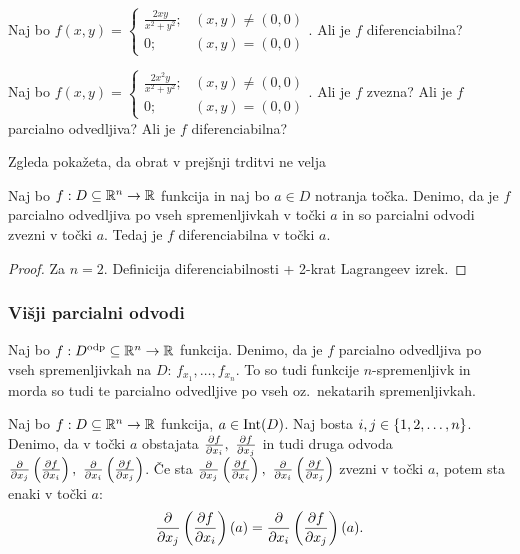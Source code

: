 \begin{zgled}
    Naj bo $f(x,y) = \begin{cases}
        \frac{2xy}{x^2+y^2}; &(x,y) \neq (0,0) \\
        0; &(x,y) = (0,0)
    \end{cases}$. Ali je $f$ diferenciabilna?
\end{zgled}

\begin{zgled}
    Naj bo $f(x,y) = \begin{cases}
        \frac{2x^2y}{x^2+y^2}; &(x,y) \neq (0,0) \\
        0; &(x,y) = (0,0)
    \end{cases}$. Ali je $f$ zvezna? Ali je $f$ parcialno odvedljiva? Ali je $f$ diferenciabilna?
\end{zgled}

\begin{opomba}
    Zgleda pokažeta, da obrat v prejšnji trditvi ne velja
\end{opomba}

\begin{izrek}
    Naj bo $f: D \subseteq \mathbb{R}^n \to \mathbb{R}$ funkcija in naj bo $a \in D$ notranja točka. Denimo, da je $f$ parcialno odvedljiva po vseh spremenljivkah v točki $a$ in so parcialni odvodi zvezni v točki $a$. Tedaj je $f$ diferenciabilna v točki $a$.
\end{izrek}

\begin{proof}
    Za $n=2$. Definicija diferenciabilnosti + 2-krat Lagrangeev izrek.
\end{proof}

\subsubsection{Višji parcialni odvodi}
Naj bo $f: D^{\text{odp}} \subseteq \mathbb{R}^n \to \mathbb{R}$ funkcija. Denimo, da je $f$ parcialno odvedljiva po vseh spremenljivkah na $D$: $f_{x_1}, \ldots, f_{x_n}$. To so tudi funkcije $n$-spremenljivk in morda so tudi te parcialno odvedljive po vseh oz.\ nekatarih spremenljivkah.

\begin{trditev}
    Naj bo $f: D \subseteq \mathbb{R}^n \to \mathbb{R}$ funkcija, \(a \in \operatorname{Int}(D)\). Naj bosta $i, j \in \left\{1, 2, \ldots, n\right\}$. Denimo, da v točki \(a\) obstajata $\podv{f}{x_i}, \ \podv{f}{x_j}$ in tudi druga odvoda $\frac{\partial}{\partial x_j} \left(\frac{\partial f}{\partial x_i}\right), \ \frac{\partial}{\partial x_i} \left(\frac{\partial f}{\partial x_j}\right)$. Če sta $\frac{\partial}{\partial x_j} \left(\frac{\partial f}{\partial x_i}\right), \ \frac{\partial}{\partial x_i} \left(\frac{\partial f}{\partial x_j}\right)$ zvezni v točki $a$, potem sta enaki v točki $a$: 
    $$\frac{\partial}{\partial x_j} \left(\frac{\partial f}{\partial x_i}\right)(a) = \frac{\partial}{\partial x_i} \left(\frac{\partial f}{\partial x_j}\right)(a).$$
\end{trditev}

